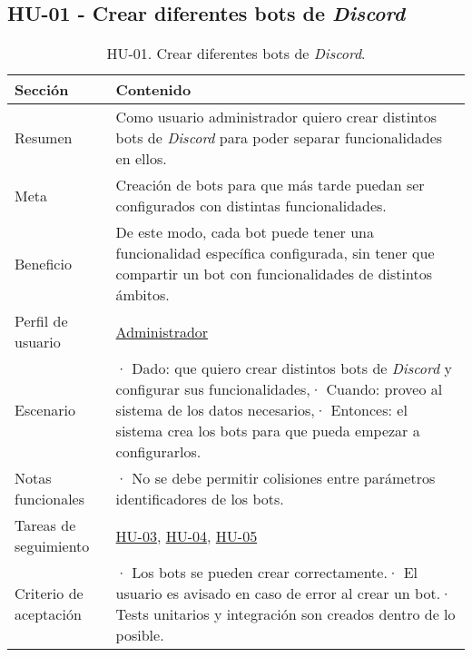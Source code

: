\subsection{HU-01 - Crear diferentes bots de \textit{Discord}}
\label{sec:hu01}

\begin{table}[H]
    \centering
    \def\arraystretch{1.25}
    \begin{adjustbox}{max width=\textwidth}
    \begin{tabularx}{\textwidth}{|l|L|}
    \hline
        \textbf{Sección} & \textbf{Contenido} \\ \hline
    \hline
        Resumen & Como usuario administrador quiero crear distintos bots de \textit{Discord} para poder separar funcionalidades en ellos. \\ \hline
        Meta & Creación de bots para que más tarde puedan ser configurados con distintas funcionalidades. \\ \hline
        Beneficio & De este modo, cada bot puede tener una funcionalidad específica configurada, sin tener que compartir un bot con funcionalidades de distintos ámbitos. \\ \hline
        Perfil de usuario & \hyperref[sec:personaAdmin]{Administrador} \\ \hline
        Escenario & · Dado: que quiero crear distintos bots de \textit{Discord} y configurar sus funcionalidades,\linebreak · Cuando: proveo al sistema de los datos necesarios,\linebreak · Entonces: el sistema crea los bots para que pueda empezar a configurarlos. \\ \hline
        Notas funcionales & · No se debe permitir colisiones entre parámetros identificadores de los bots. \\ \hline
        Tareas de seguimiento & \hyperref[sec:hu03]{HU-03}, \hyperref[sec:hu04]{HU-04}, \hyperref[sec:hu05]{HU-05}  \\ \hline
        Criterio de aceptación & · Los bots se pueden crear correctamente.\linebreak · El usuario es avisado en caso de error al crear un bot.\linebreak · Tests unitarios y integración son creados dentro de lo posible. \\ \hline
    \end{tabularx}
    \end{adjustbox}
    \caption{HU-01. Crear diferentes bots de \textit{Discord}.}
\end{table}


